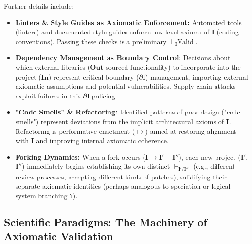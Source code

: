\documentclass{article}
\newcommand{\Isness}{\mathbf{I}}            %
\newcommand{\Inness}{\mathbf{In}}           %
\newcommand{\Outness}{\mathbf{Out}}         %
\newcommand{\enactment}{\ensuremath{\mapsto}} %
\newcommand{\validates}[1]{\ensuremath{\vdash_{#1}}} %
\newcommand{\boundary}[1]{\ensuremath{\partial #1}} %
\begin{document}
Further details include:
\begin{itemize}
    \item \textbf{Linters \& Style Guides as Axiomatic Enforcement:} Automated tools (linters) and documented style guides enforce low-level axioms of $\Isness$ (coding conventions). Passing these checks is a preliminary $\validates{\Isness} \text{Valid}$.
    \item \textbf{Dependency Management as Boundary Control:} Decisions about which external libraries ($\Outness$-sourced functionality) to incorporate into the project ($\Inness$) represent critical boundary ($\boundary{\Isness}$) management, importing external axiomatic assumptions and potential vulnerabilities. Supply chain attacks exploit failures in this $\boundary{\Isness}$ policing.
    \item \textbf{"Code Smells" \& Refactoring:} Identified patterns of poor design ("code smells") represent deviations from the implicit architectural axioms of $\Isness$. Refactoring is performative enactment ($\enactment$) aimed at restoring alignment with $\Isness$ and improving internal axiomatic coherence.
    \item \textbf{Forking Dynamics:} When a fork occurs ($\Isness \rightarrow \Isness' + \Isness''$), each new project ($\Isness'$, $\Isness''$) immediately begins establishing its own distinct $\validates{\Isness' / \Isness''}$ (e.g., different review processes, accepting different kinds of patches), solidifying their separate axiomatic identities (perhaps analogous to speciation \citep{Dawkins1976} or logical system branching \citep{Hofstadter1979}?).
\end{itemize}

\subsection{Scientific Paradigms: The Machinery of Axiomatic Validation}
\end{document}
